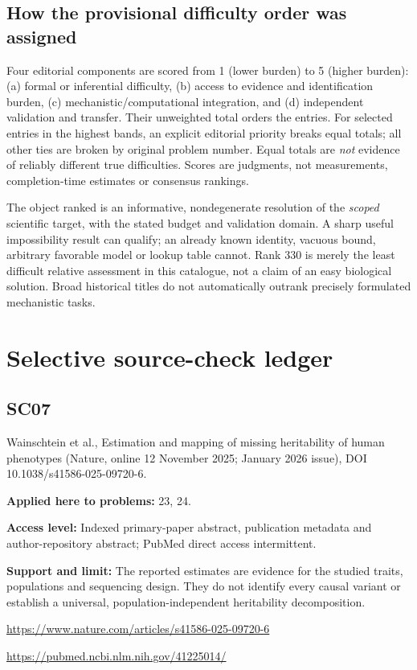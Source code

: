 \documentclass[11pt]{article}
\begin{document}
\subsection*{How the provisional difficulty order was assigned}
Four editorial components are scored from 1 (lower burden) to 5 (higher burden): (a) formal or inferential difficulty, (b) access to evidence and identification burden, (c) mechanistic/computational integration, and (d) independent validation and transfer. Their unweighted total orders the entries. For selected entries in the highest bands, an explicit editorial priority breaks equal totals; all other ties are broken by original problem number. Equal totals are \emph{not} evidence of reliably different true difficulties. Scores are judgments, not measurements, completion-time estimates or consensus rankings.

The object ranked is an informative, nondegenerate resolution of the \emph{scoped} scientific target, with the stated budget and validation domain. A sharp useful impossibility result can qualify; an already known identity, vacuous bound, arbitrary favorable model or lookup table cannot. Rank 330 is merely the least difficult relative assessment in this catalogue, not a claim of an easy biological solution. Broad historical titles do not automatically outrank precisely formulated mechanistic tasks.


\section*{Selective source-check ledger}
\subsection*{SC07}\label{check:SC07}

Wainschtein et al., Estimation and mapping of missing heritability of human phenotypes (Nature, online 12 November 2025; January 2026 issue), DOI 10.1038/s41586-025-09720-6.

\textbf{Applied here to problems:} 23, 24.

\textbf{Access level:} Indexed primary-paper abstract, publication metadata and author-repository abstract; PubMed direct access intermittent.

\textbf{Support and limit:} The reported estimates are evidence for the studied traits, populations and sequencing design. They do not identify every causal variant or establish a universal, population-independent heritability decomposition.

\url{https://www.nature.com/articles/s41586-025-09720-6}

\url{https://pubmed.ncbi.nlm.nih.gov/41225014/}
\end{document}
